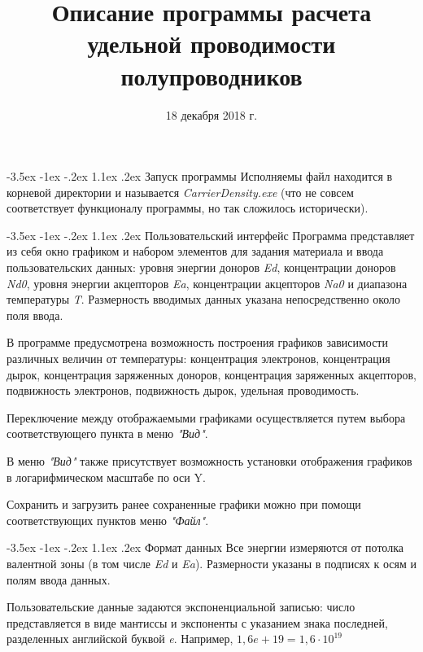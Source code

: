 \documentclass[12pt,a4paper]{extarticle}
\title{Описание программы расчета удельной проводимости полупроводников}
\date{18 декабря 2018 г.}
\makeatletter
\renewcommand\section{\@startsection{section}{1}{\z@}%
	{-3.5ex \@plus -1ex \@minus -.2ex}%
	{1.1ex \@plus.2ex}%
	{\normalfont\normalfont\bfseries}}%
\makeatother
\begin{document}
\maketitle
\section{Запуск программы}
Исполняемы файл находится в корневой директории и называется \textit{CarrierDensity.exe} (что не совсем соответствует функционалу программы, но так сложилось исторически).

\section{Пользовательский интерфейс}
Программа представляет из себя окно графиком и набором элементов для задания материала и ввода пользовательских данных: уровня энергии доноров \textit{Ed}, концентрации доноров \textit{Nd0}, уровня энергии акцепторов \textit{Ea}, концентрации акцепторов \textit{Na0} и диапазона температуры \textit{T}. Размерность вводимых данных указана непосредственно около поля ввода.

В программе предусмотрена возможность построения графиков зависимости различных величин от температуры: концентрация электронов, концентрация дырок, концентрация заряженных доноров, концентрация заряженных акцепторов, подвижность электронов, подвижность дырок, удельная проводимость.

Переключение между отображаемыми графиками осуществляется путем выбора соответствующего пункта в меню \textit{"Вид"}.

В меню \textit{"Вид"} также присутствует возможность установки отображения графиков в логарифмическом масштабе по оси Y.

Сохранить и загрузить ранее сохраненные графики можно при помощи соответствующих пунктов меню \textit{"Файл"}.

\section{Формат данных}
Все энергии измеряются от потолка валентной зоны (в том числе \textit{Ed} и \textit{Ea}). Размерности указаны в подписях к осям и полям ввода данных.

Пользовательские данные задаются экспоненциальной записью: число представляется в виде мантиссы и экспоненты с указанием знака последней, разделенных английской буквой \textit{e}. Например, $1,6e+19 = 1,6 \cdot 10^{19}$
\end{document}
